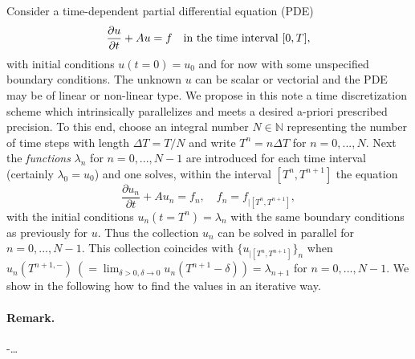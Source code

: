 Consider a time-dependent partial differential equation (PDE)
\begin{equation}
\frac{\partial{u}}{\partial{t}} + Au = f\quad \textnormal{in the time interval}\ [0, T],
\end{equation}
with initial conditions $u(t=0) = u_0$ and for now with some unspecified boundary conditions.
The unknown $u$ can be scalar or vectorial and the PDE may be of linear or non-linear type.
We propose in this note a time discretization scheme which intrinsically parallelizes and
meets a desired a-priori prescribed precision. To this end, choose an integral number 
$N \in \mathbb{N}$ representing the number of time steps with length $\Delta T = T / N$ 
and write $T^n = n \Delta T$ for $n=0, ... ,N$. Next the \textit{functions} $\lambda_n$ for
$n=0, ..., N-1$ are introduced for each time interval (certainly $\lambda_0 = u_0$) and one
solves, within the interval $[T^n, T^{n+1}]$ the equation
\begin{equation}
\frac{\partial u_n}{\partial t} + A u_n = f_n, \quad f_n = f_{|[T^n, T^{n+1}]},
\end{equation}
with the initial conditions $u_n(t=T^n)=\lambda_n$ with the same boundary conditions as
previously for $u$. Thus the collection $u_n$ can be solved in parallel for $n=0, ..., N-1$.
This collection coincides with 
$\{u_{|[T^n, T^{n+1}]}\}_n$ when $u_n(T^{n+1,-})\ (=\lim_{\delta>0, \delta \to 0} u_n(T^{n+1} - \delta)) = \lambda_{n+1}$
for $n=0, ..., N-1$. We show in the following how to find the values in an iterative way.

\paragraph{Remark.}-\dots
